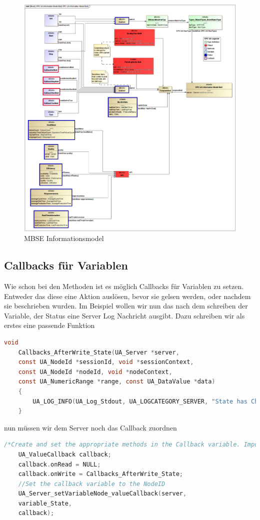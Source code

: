 \begin{figure}[H]
	\centering
	\includegraphics[width=1\linewidth]{"abb/konOPC UA Information Model Belt"}
	\caption{MBSE Informationsmodel}
	\label{fig:konopc-ua-information-model-belt}
\end{figure}

\subsection{Callbacks für Variablen}
Wie schon bei den Methoden ist es möglich Callbacks für Variablen zu setzen. Entweder das diese eine Aktion auslösen, bevor sie gelsen werden, oder nachdem sie beschrieben wurden.
Im Beispiel wollen wir nun das nach dem schreiben der Variable, der Status eine Server Log Nachricht ausgibt. Dazu schreiben wir als erstes eine passende Funktion 
\begin{lstlisting}[language=C]
	void 
	Callbacks_AfterWrite_State(UA_Server *server,
	const UA_NodeId *sessionId, void *sessionContext,
	const UA_NodeId *nodeId, void *nodeContext,
	const UA_NumericRange *range, const UA_DataValue *data)
	{
		UA_LOG_INFO(UA_Log_Stdout, UA_LOGCATEGORY_SERVER, "State has Changed");
	}        
\end{lstlisting}
nun müssen wir dem Server noch das Callback zuordnen
\begin{lstlisting}[language=C]
	/*Create and set the appropriate methods in the Callback variable. Important if you don't assign a function you have to set NULL, otherwise unexpected pointer errors can occur.*/
	UA_ValueCallback callback;
	callback.onRead = NULL;
	callback.onWrite = Callbacks_AfterWrite_State;
	//Set the callback variable to the NodeID
	UA_Server_setVariableNode_valueCallback(server, 
	variable_State,
	callback);
\end{lstlisting}

